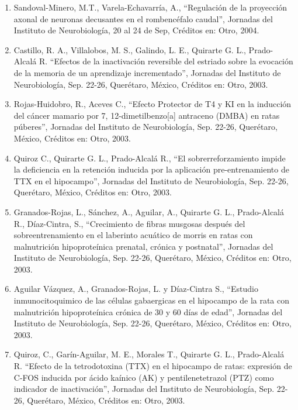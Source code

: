 \documentclass[12pt]{article}
\begin{document}
\begin{enumerate}
\item Sandoval-Minero, M.T., Varela-Echavarría, A., “Regulación de la proyección axonal de neuronas decusantes en el rombencéfalo 
caudal”, Jornadas del Instituto de Neurobiología, 20 al 24 de Sep, Créditos en: Otro, 2004.

\item Castillo, R. A., Villalobos, M. S., Galindo, L. E., Quirarte G. L., Prado-Alcalá R. “Efectos de la inactivación reversible del 
estriado sobre la evocación de la memoria de un aprendizaje incrementado”, Jornadas del Instituto de Neurobiología, Sep. 22-26, 
Querétaro, México, Créditos en: Otro, 2003.

\item Rojas-Huidobro, R., Aceves C., “Efecto Protector de T4 y KI en la inducción del cáncer mamario por 7, 12-dimetilbenzo[a] 
antraceno 
(DMBA) en ratas púberes”, Jornadas del Instituto de Neurobiología, Sep. 22-26, Querétaro, México, Créditos en: Otro, 2003.

\item Quiroz C., Quirarte G. L., Prado-Alcalá R., “El sobrerreforzamiento impide la deficiencia en la retención inducida por la 
aplicación pre-entrenamiento de TTX en el hipocampo”, Jornadas del Instituto de Neurobiología, Sep. 22-26, Querétaro, México, Créditos 
en: Otro, 2003.

\item Granados-Rojas, L., Sánchez, A., Aguilar, A., Quirarte G. L., Prado-Alcalá R., Díaz-Cintra, S., “Crecimiento de fibras musgosas 
después del sobreentrenamiento en el laberinto acuático de morris en ratas con malnutrición hipoproteínica prenatal, crónica y 
postnatal”, Jornadas del Instituto de Neurobiología, Sep. 22-26, Querétaro, México, Créditos en: Otro, 2003.

\item Aguilar Vázquez, A., Granados-Rojas, L. y Díaz-Cintra S., “Estudio inmunocitoquimico de las células gabaergicas en el hipocampo 
de 
la rata con malnutrición hipoproteínica crónica de 30 y 60 días de edad”, Jornadas del Instituto de Neurobiología, Sep. 22-26, 
Querétaro, México, Créditos en: Otro, 2003.

\item Quiroz, C., Garín-Aguilar, M. E., Morales T., Quirarte G. L., Prado-Alcalá R. “Efecto de la tetrodotoxina (TTX) en el hipocampo 
de 
ratas: expresión de C-FOS inducida por ácido kaínico (AK) y pentilenetetrazol (PTZ) como indicador de inactivación”, Jornadas del 
Instituto de Neurobiología, Sep. 22-26, Querétaro, México, Créditos en: Otro, 2003.


\end{enumerate}
\end{document}
